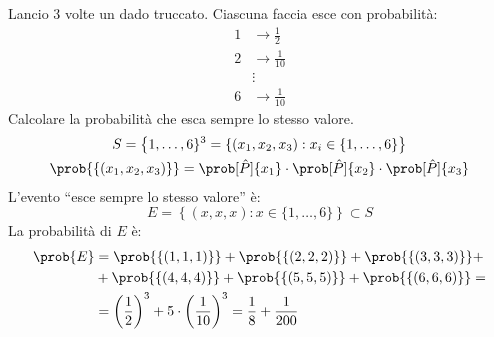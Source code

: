 \begin{esercizio}
Lancio 3 volte un dado truccato. Ciascuna faccia esce con probabilit\`a:
\begin{align*}
1 &\to \frac{1}{2} \\
2 &\to \frac{1}{10} \\
& \vdots \\
6 &\to \frac{1}{10}
\end{align*}
Calcolare la probabilit\`a che esca sempre lo stesso valore.
\begin{gather*}
S = \left\{ 1, \ldots, 6 \}^3 = \{ (x_1, x_2, x_3) : x_i \in \{1, \ldots, 6\} \right\} \\
\prob{\{(x_1, x_2, x_3)\}} = \prob[\hat{P}]{\{x_1\}} \cdot \prob[\hat{P}]{\{x_2\}} \cdot \prob[\hat{P}]{\{x_3\}}
\end{gather*}
L'evento ``esce sempre lo stesso valore'' \`e:
\[
E = \left\{ (x, x, x) : x \in \{1, \ldots, 6\} \right\} \subset S
\]
La probabilit\`a di $E$ \`e:
\begin{align*}
\prob{E} &= \prob{\{(1,1,1)\}} + \prob{\{(2,2,2)\}} + \prob{\{(3,3,3)\}} + \\
&+ \prob{\{(4,4,4)\}} + \prob{\{(5,5,5)\}} + \prob{\{(6,6,6)\}} = \\
&= \left( \frac{1}{2} \right)^3 + 5 \cdot \left( \frac{1}{10} \right)^3 = \frac{1}{8} + \frac{1}{200}
\end{align*}
\end{esercizio}














